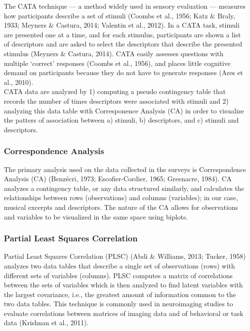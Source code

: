 \documentclass[
  english,
  man,floatsintext]{apa6}
\begin{document}
The CATA technique --- a method widely used in sensory evaluation --- measures how participants describe a set of stimuli (Coombs et al., 1956; Katz \& Braly, 1933; Meyners \& Castura, 2014; Valentin et al., 2012). In a CATA task, stimuli are presented one at a time, and for each stimulus, participants are shown a list of descriptors and are asked to select the descriptors that describe the presented stimulus (Meyners \& Castura, 2014). CATA easily assesses questions with multiple `correct' responses (Coombs et al., 1956), and places little cognitive demand on participants because they do not have to generate responses (Ares et al., 2010).\\
CATA data are analyzed by 1) computing a pseudo contingency table that records the number of times descriptors were associated with stimuli and 2) analyzing this data table with Corresponence Analysis (CA) in order to visualize the patters of association between a) stimuli, b) descriptors, and c) stimuli and descriptors.

\hypertarget{correspondence-analysis}{%
\subsubsection{Correspondence Analysis}\label{correspondence-analysis}}

The primary analysis used on the data collected in the surveys is Correspondence Analysis (CA) (Benzécri, 1973; Escofier-Cordier, 1965; Greenacre, 1984). CA analyzes a contingency table, or any data structured similarly, and calculates the relationships between rows (observations) and columns (variables); in our case, musical excerpts and descriptors. The nature of the CA allows for observations and variables to be visualized in the same space using biplots.

\hypertarget{partial-least-squares-correlation}{%
\subsubsection{Partial Least Squares Correlation}\label{partial-least-squares-correlation}}

Partial Least Squares Correlation (PLSC) (Abdi \& Williams, 2013; Tucker, 1958) analyzes two data tables that describe a single set of observations (rows) with different sets of variables (columns). PLSC computes a matrix of correlations between the sets of variables which is then analyzed to find latent variables with the largest covariance, i.e., the greatest amount of information common to the two data tables. This technique is commonly used in neuroimaging studies to evaluate correlations between matrices of imaging data and of behavioral or task data (Krishnan et al., 2011).
\end{document}
